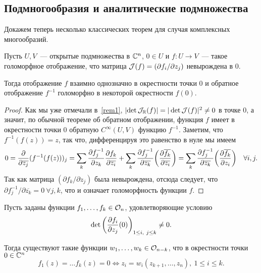     \subsection{Подмногообразия и аналитические подмножества}
    
    Докажем теперь несколько классических теорем для случая комплексных многообразий. 
    
    \begin{theorem}
        Пусть $U, V$~--- открытые подмножества в $\C^n$, $0 \in U$ и $f\colon U \to V$~---
        такое голоморфное отображение, что матрица $\cJ(f) = \lr*{\partial f_i / \partial z_{j}}$ невырождена в $0$.
        
        Тогда отображение $f$ взаимно однозначно в окрестности точки $0$ и обратное отображение $f^{-1}$
        голоморфно в некоторой окрестности $f(0)$.
    \end{theorem}
    
    \begin{proof}
        Как мы уже отмечали в~\ref{rem1}, $\left\lvert \det \cJ_{\R}(f) \right\rvert = |\det{\cJ(f)}|^2 \neq 0$ в точке $0$, а
        значит, по обычной теореме об обратном отображении, функция $f$ имеет в окрестности точки $0$
        обратную $C^{\infty}(U, V)$ функцию $f^{-1}$. Заметим, что $f^{-1}(f(z)) = z$, так что,
        дифференцируя это равенство в нуле мы имеем
        \[ 0 = \frac{\partial}{\partial \overline{z_j}}(f^{-1}(f(z)))_{j} = \sum_{k} \frac{\partial f^{-1}_{j}}{\partial z_k}\frac{\partial f_k}{\partial \overline{z_i}} + \sum_{k} \frac{\partial f^{-1}_{j}}{\partial \overline{z_k}}\lr*{\frac{\partial \overline{f_k}}{\partial\overline{z_i}}} = \sum_{k} \frac{\partial f_{j}^{-1}}{\partial \overline{z_k}} \lr*{\frac{\partial \overline{f_k}}{\partial z_i}} \quad \forall i, j. \]
        Так как матрица $(\partial f_k / \partial z_j)$ была невырождена, отсюда следует, что
        $\partial f_j^{-1} / \partial \overline{z_k} = 0 \ \forall j, k$, что и означает голоморфность функции $f$.
    \end{proof}

    \begin{theorem}
        Пусть заданы функции $f_1, \ldots, f_k \in \cO_n$, удовлетворяющие условию
        \[ \det{\lr*{\frac{\partial f_i}{\partial z_j}(0)}}_{1 \le i, \ j \le k} \neq 0. \]

        Тогда существуют такие функции $w_1, \ldots, w_k \in \cO_{n - k}$, что в окрестности точки $0 \in \C^n$
        \[ f_1(z) = \ldots f_k(z) = 0 \Leftrightarrow z_i = w_i(z_{k + 1}, \ldots, z_n), \ 1 \le i \le k.  \]

    \end{theorem}